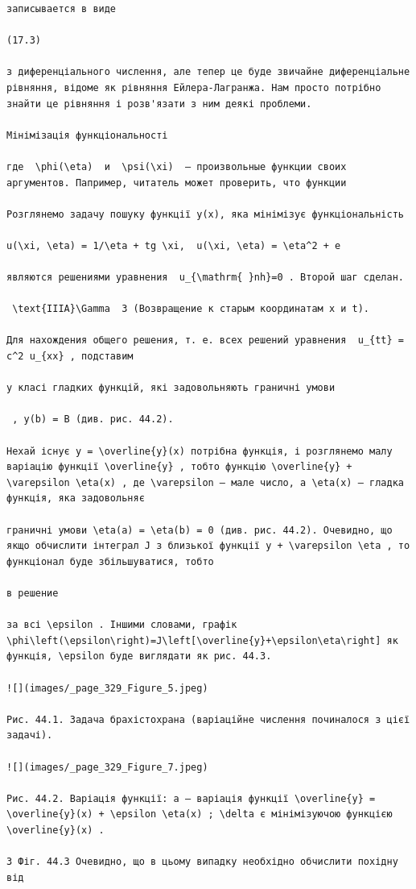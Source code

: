 \documentclass[
  ukrainian,
]{article}
\begin{document}
\begin{verbatim}
записывается в виде

(17.3)

з диференціального числення, але тепер це буде звичайне диференціальне рівняння, відоме як рівняння Ейлера-Лагранжа. Нам просто потрібно знайти це рівняння і розв'язати з ним деякі проблеми.

Мінімізація функціональності

где  \phi(\eta)  и  \psi(\xi)  — произвольные функции своих аргументов. Папример, читатель может проверить, что функции

Розглянемо задачу пошуку функції y(x), яка мінімізує функціональність

u(\xi, \eta) = 1/\eta + tg \xi,  u(\xi, \eta) = \eta^2 + e 

являются решениями уравнения  u_{\mathrm{ }nh}=0 . Второй шаг сделан.

 \text{IIIA}\Gamma  3 (Возвращение к старым координатам x и t).

Для нахождения общего решения, т. е. всех решений уравнения  u_{tt} = c^2 u_{xx} , подставим

у класі гладких функцій, які задовольняють граничні умови

 , y(b) = B (див. рис. 44.2).

Нехай існує y = \overline{y}(x) потрібна функція, і розглянемо малу варіацію функції \overline{y} , тобто функцію \overline{y} + \varepsilon \eta(x) , де \varepsilon — мале число, а \eta(x) — гладка функція, яка задовольняє

граничні умови \eta(a) = \eta(b) = 0 (див. рис. 44.2). Очевидно, що якщо обчислити інтеграл J з близької функції y + \varepsilon \eta , то функціонал буде збільшуватися, тобто

в решение

за всі \epsilon . Іншими словами, графік \phi\left(\epsilon\right)=J\left[\overline{y}+\epsilon\eta\right] як функція, \epsilon буде виглядати як рис. 44.3.

![](images/_page_329_Figure_5.jpeg)

Рис. 44.1. Задача брахістохрана (варіаційне числення починалося з цієї задачі).

![](images/_page_329_Figure_7.jpeg)

Рис. 44.2. Варіація функції: a — варіація функції \overline{y} = \overline{y}(x) + \epsilon \eta(x) ; \delta є мінімізуючою функцією \overline{y}(x) .

З Фіг. 44.3 Очевидно, що в цьому випадку необхідно обчислити похідну від


\end{verbatim}
\end{document}
